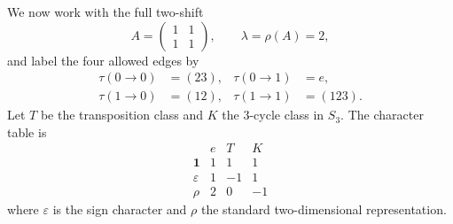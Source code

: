 We now work with the full two-shift
\[
  A=
  \begin{pmatrix}
    1 & 1 \\
    1 & 1
  \end{pmatrix},
  \qquad
  \lambda=\rho(A)=2,
\]
and label the four allowed edges by
\begin{equation}\label{eq:s3-example-edge-labels}
  \begin{aligned}
    \tau(0\to 0)&=(23), & \tau(0\to 1)&=e, \\
    \tau(1\to 0)&=(12), & \tau(1\to 1)&=(123).
  \end{aligned}
\end{equation}
Let \(T\) be the transposition class and \(K\) the \(3\)-cycle class in
\(S_3\). The character table is
\begin{equation}\label{eq:s3-character-table}
  \begin{array}{c|ccc}
    & e & T & K \\ \hline
    \mathbf 1 & 1 & 1 & 1 \\
    \varepsilon & 1 & -1 & 1 \\
    \rho & 2 & 0 & -1
  \end{array}
\end{equation}
where \(\varepsilon\) is the sign character and \(\rho\) the standard
two-dimensional representation.

